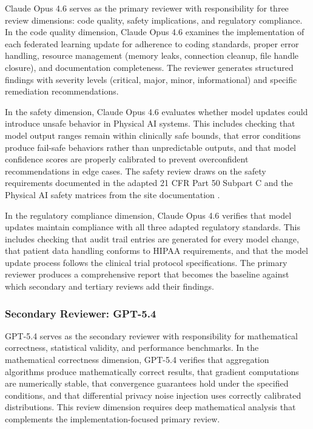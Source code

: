 Claude Opus 4.6 \cite{claude-opus} serves as the primary reviewer with
responsibility for three review dimensions: code quality, safety implications,
and regulatory compliance. In the code quality dimension, Claude Opus 4.6
examines the implementation of each federated learning update for adherence to
coding standards, proper error handling, resource management (memory leaks,
connection cleanup, file handle closure), and documentation completeness. The
reviewer generates structured findings with severity levels (critical, major,
minor, informational) and specific remediation recommendations.

In the safety dimension, Claude Opus 4.6 evaluates whether model updates could
introduce unsafe behavior in Physical AI systems. This includes checking that
model output ranges remain within clinically safe bounds, that error conditions
produce fail-safe behaviors rather than unpredictable outputs, and that model
confidence scores are properly calibrated to prevent overconfident
recommendations in edge cases. The safety review draws on the safety
requirements documented in the adapted 21 CFR Part 50 \cite{cfr50-adapt}
Subpart C and the Physical AI safety matrices from the site documentation
\cite{site-docs}.

In the regulatory compliance dimension, Claude Opus 4.6 verifies that model
updates maintain compliance with all three adapted regulatory standards. This
includes checking that audit trail entries are generated for every model change,
that patient data handling conforms to HIPAA \cite{hipaa} requirements, and that
the model update process follows the clinical trial protocol specifications. The
primary reviewer produces a comprehensive report that becomes the baseline
against which secondary and tertiary reviews add their findings.

\subsubsection{Secondary Reviewer: GPT-5.4}

GPT-5.4 \cite{gpt-5-4} serves as the secondary reviewer with responsibility
for mathematical correctness, statistical validity, and performance benchmarks.
In the mathematical correctness dimension, GPT-5.4 verifies that aggregation
algorithms produce mathematically correct results, that gradient computations
are numerically stable, that convergence guarantees hold under the specified
conditions, and that differential privacy noise injection uses correctly
calibrated distributions. This review dimension requires deep mathematical
analysis that complements the implementation-focused primary review.

